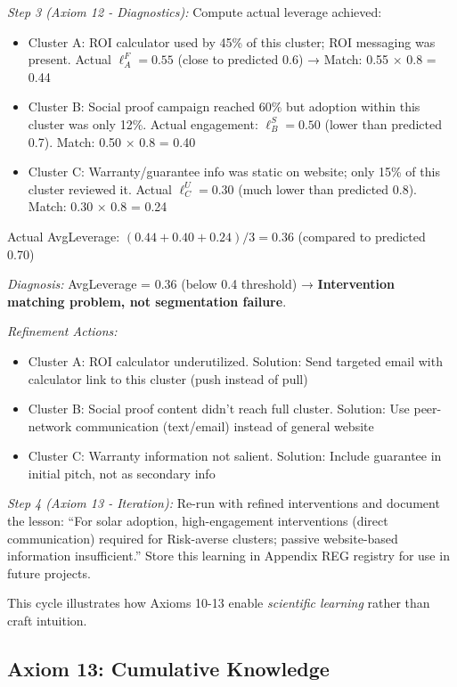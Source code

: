 \textit{Step 3 (Axiom 12 - Diagnostics):} Compute actual leverage achieved:
\begin{itemize}[nosep]
\item Cluster A: ROI calculator used by 45\% of this cluster; ROI messaging was present. Actual $\ell_A^{F} = 0.55$ (close to predicted 0.6) → Match: 0.55 × 0.8 = 0.44
\item Cluster B: Social proof campaign reached 60\% but adoption within this cluster was only 12\%. Actual engagement: $\ell_B^{S} = 0.50$ (lower than predicted 0.7). Match: 0.50 × 0.8 = 0.40
\item Cluster C: Warranty/guarantee info was static on website; only 15\% of this cluster reviewed it. Actual $\ell_C^{U} = 0.30$ (much lower than predicted 0.8). Match: 0.30 × 0.8 = 0.24
\end{itemize}

Actual AvgLeverage: $(0.44 + 0.40 + 0.24) / 3 = 0.36$ (compared to predicted 0.70)

\textit{Diagnosis:} AvgLeverage = 0.36 (below 0.4 threshold) → \textbf{Intervention matching problem, not segmentation failure}.

\textit{Refinement Actions:}
\begin{itemize}[nosep]
\item Cluster A: ROI calculator underutilized. Solution: Send targeted email with calculator link to this cluster (push instead of pull)
\item Cluster B: Social proof content didn't reach full cluster. Solution: Use peer-network communication (text/email) instead of general website
\item Cluster C: Warranty information not salient. Solution: Include guarantee in initial pitch, not as secondary info
\end{itemize}

\textit{Step 4 (Axiom 13 - Iteration):} Re-run with refined interventions and document the lesson: ``For solar adoption, high-engagement interventions (direct communication) required for Risk-averse clusters; passive website-based information insufficient.'' Store this learning in Appendix REG registry for use in future projects.

This cycle illustrates how Axioms 10-13 enable \emph{scientific learning} rather than craft intuition.

\subsection{Axiom 13: Cumulative Knowledge}

